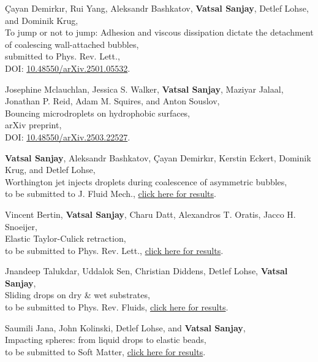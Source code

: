 \documentclass[10pt,a4paper,colorlinks,linkcolor=blue,urlcolor=blue,citecolor=blue]{moderncv}
\begin{document}
\begin{enumerate}[leftmargin=1.5em,label=\textbf{[\arabic*]}]
	\item Çayan Demirkır, Rui Yang, Aleksandr Bashkatov, \textbf{Vatsal Sanjay}, Detlef Lohse, and Dominik Krug,\\
	To jump or not to jump: Adhesion and viscous dissipation dictate the detachment of coalescing wall-attached bubbles,\\
	submitted to Phys. Rev. Lett.,\\
	\faFile\hspace{0.2em}DOI: \href{https://doi.org/10.48550/arXiv.2501.05532}{10.48550/arXiv.2501.05532}.

	\item Josephine Mclauchlan, Jessica S. Walker, \textbf{Vatsal Sanjay}, Maziyar Jalaal, Jonathan P. Reid, Adam M. Squires, and Anton Souslov,\\
	Bouncing microdroplets on hydrophobic surfaces,\\
	arXiv preprint,\\
	\faFile\hspace{0.2em}DOI: \href{https://doi.org/10.48550/arXiv.2503.22527}{10.48550/arXiv.2503.22527}.

	\item \textbf{Vatsal Sanjay}, Aleksandr Bashkatov, Çayan Demirkır, Kerstin Eckert, Dominik Krug, and Detlef Lohse,\\
	Worthington jet injects droplets during coalescence of asymmetric bubbles,\\
	to be submitted to J. Fluid Mech., \href{https://youtu.be/WZonMHzzkXQ}{click here for results}.

	\item Vincent Bertin, \textbf{Vatsal Sanjay}, Charu Datt, Alexandros T. Oratis, Jacco H. Snoeijer,\\
	Elastic Taylor-Culick retraction,\\
	to be submitted to Phys. Rev. Lett., \href{https://tinyurl.com/2cvo89bd}{click here for results}.

	\item Jnandeep Talukdar, Uddalok Sen, Christian Diddens, Detlef Lohse, \textbf{Vatsal Sanjay},\\
	Sliding drops on dry \& wet substrates,\\
	to be submitted to Phys. Rev. Fluids, \href{https://tinyurl.com/2xvlhlc6}{click here for results}.

	\item Saumili Jana, John Kolinski, Detlef Lohse, and \textbf{Vatsal Sanjay},\\
	Impacting spheres: from liquid drops to elastic beads,\\
	to be submitted to Soft Matter, \href{https://tinyurl.com/28s25jvf}{click here for results}.

\end{enumerate}
\end{document}
